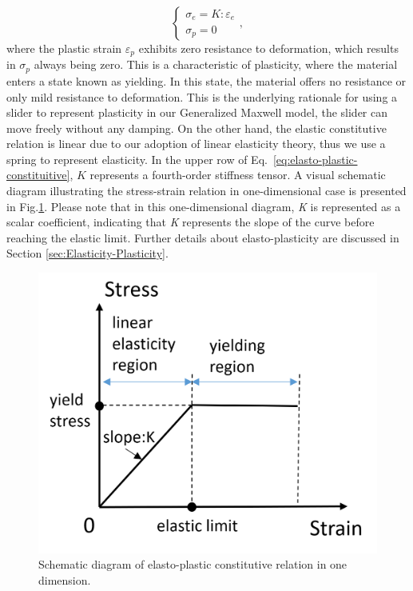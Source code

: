 \documentclass[10pt,journal,compsoc]{IEEEtran}
\begin{document}
\begin{equation}
	\begin{cases}
		\sigma_e = K:\varepsilon_e \\
		\sigma_p = 0
	\end{cases},\label{eq:elasto-plastic-constituitive}
\end{equation}
where the plastic strain $\varepsilon_{p}$ exhibits zero resistance to deformation, which results in $\sigma_{p}$ always being zero. This is a characteristic of plasticity, where the material enters a state known as yielding. In this state, the material offers no resistance or only mild resistance to deformation. This is the underlying rationale for using a slider to represent plasticity in our Generalized Maxwell model, the slider can move freely without any damping. On the other hand, the elastic constitutive relation is linear due to our adoption of linear elasticity theory, thus we use a spring to represent elasticity. In the upper row of Eq.~\ref{eq:elasto-plastic-constituitive}, $\mathit{K}$ represents a fourth-order stiffness tensor. A visual schematic diagram illustrating the stress-strain relation in one-dimensional case is presented in Fig.\ref{fig:elasto-plastic-constitution}. Please note that in this one-dimensional diagram, \textit{K} is represented as a scalar coefficient, indicating that \textit{K} represents the slope of the curve before reaching the elastic limit. Further details about elasto-plasticity are discussed in Section \ref{sec:Elasticity-Plasticity}.


\begin{figure}[htbp]
	\centering
	\includegraphics[width=0.7\linewidth]{pics/stress-strain.png}
	\caption{Schematic diagram of elasto-plastic constitutive relation in one dimension.}     \label{fig:elasto-plastic-constitution}
\end{figure}
\end{document}
